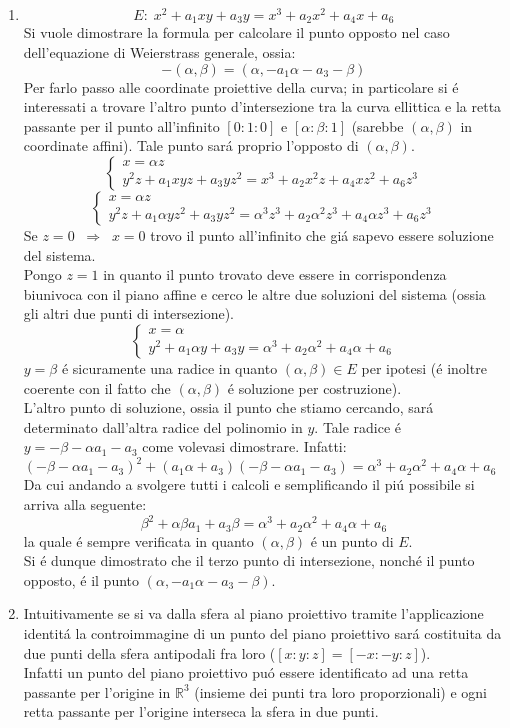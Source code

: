 \documentclass[a4paper]{article}
\newcommand{\R}{\mathbb{R}}
\newcommand{\sist}{\begin{cases}}
\newcommand{\esist}{\end{cases}}
\begin{document}
\begin{enumerate}
\item $$E:\;x^2 +a_1 xy +a_3 y=x^3+a_2 x^2+a_4 x+a_6$$
Si vuole dimostrare la formula per calcolare il punto opposto nel caso dell'equazione di Weierstrass generale, ossia:
$$-(\alpha,\beta)=(\alpha,-a_1\alpha -a_3 -\beta)$$
Per farlo passo alle coordinate proiettive della curva; in particolare si \'e interessati a trovare l'altro punto d'intersezione tra la curva ellittica e la retta passante per il punto all'infinito $[0:1:0]$ e 
$[\alpha:\beta:1]$ (sarebbe $(\alpha,\beta)$ in coordinate affini). Tale punto sar\'a proprio l'opposto di 
$(\alpha,\beta)$.\\
$$
\sist
x=\alpha z \\
y^2z+a_1 xyz +a_3 yz^2=x^3+a_2 x^2z +a_4 xz^2+ a_6z^3
\esist
$$
$$
\sist
x=\alpha z \\
y^2z+a_1 \alpha yz^2 +a_3 yz^2=\alpha^3 z^3 +a_2 \alpha^2 z^3 +a_4 \alpha z^3+ a_6z^3
\esist
$$
Se $z=0\;\;\Rightarrow\;\;x=0$ trovo il punto all'infinito che gi\'a sapevo essere soluzione del sistema.\\
Pongo $z=1$ in quanto il punto trovato deve essere in corrispondenza biunivoca con il piano affine e cerco le altre due soluzioni del sistema (ossia gli altri due punti di intersezione).
$$
\sist
x=\alpha \\
y^2+a_1 \alpha y +a_3 y=\alpha^3  +a_2 \alpha^2  +a_4 \alpha + a_6
\esist
$$ 
$y=\beta $ \'e sicuramente una radice in quanto $(\alpha, \beta)\in E$ per ipotesi (\'e inoltre coerente con il fatto che $(\alpha,\beta)$ \'e soluzione per costruzione).\\
L'altro punto di soluzione, ossia il punto che stiamo cercando, sar\'a determinato dall'altra radice del polinomio in $y$. Tale radice \'e $y=-\beta-\alpha a_1-a_3$ come volevasi dimostrare. Infatti:
$(-\beta-\alpha a_1-a_3)^2 + (a_1 \alpha +a_3)(-\beta-\alpha a_1-a_3)=\alpha^3  +a_2 \alpha^2  +a_4 \alpha + a_6$\\
Da cui andando a svolgere tutti i calcoli e semplificando il pi\'u possibile si arriva alla seguente:
$$\beta^2+\alpha \beta a_1+a_3\beta=\alpha^3  +a_2 \alpha^2  +a_4 \alpha + a_6$$ 
la quale \'e sempre verificata in quanto $(\alpha, \beta)$ \'e un punto di $E$.\\
Si \'e dunque dimostrato che il terzo punto di intersezione, nonch\'e il punto opposto, \'e il punto
$(\alpha,-a_1\alpha -a_3 -\beta)$.


\item Intuitivamente se si va dalla sfera al piano proiettivo tramite l'applicazione identit\'a la controimmagine di un punto del piano proiettivo sar\'a costituita da due punti della sfera antipodali fra loro
($[x:y:z]=[-x:-y:z]$).\\ Infatti un punto del piano proiettivo pu\'o essere identificato ad una retta passante per l'origine in $\R^3$ (insieme dei punti tra loro proporzionali) e ogni retta passante per l'origine interseca la sfera in due punti. 






\end{enumerate}
\end{document}
